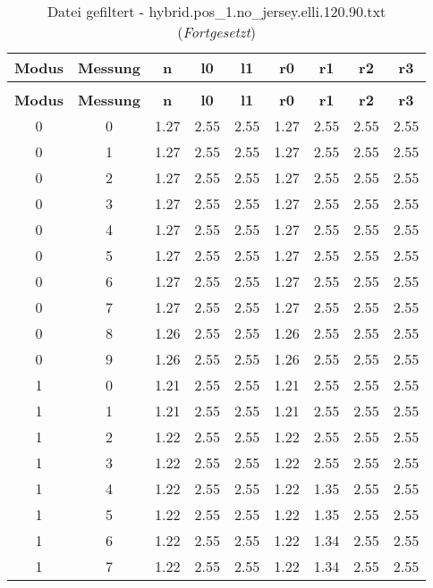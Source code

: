 \begin{longtable}{|c|c||c||c|c||c|c|c|c|}
	\caption{Datei gefiltert - hybrid.pos\_1.no\_jersey.elli.120.90.txt} \label{tab:hybrid.pos-1.no-jersey.elli.120.90.txt} \\ \hline
	\textbf{Modus} & \textbf{Messung} & \textbf{n} & \textbf{l0} & \textbf{l1} & \textbf{r0} & \textbf{r1} & \textbf{r2} & \textbf{r3}\\ \hline
	\endfirsthead
	\caption[]{Datei gefiltert - hybrid.pos\_1.no\_jersey.elli.120.90.txt (\emph{Fortgesetzt})} \\ \hline
	\textbf{Modus} & \textbf{Messung} & \textbf{n} & \textbf{l0} & \textbf{l1} & \textbf{r0} & \textbf{r1} & \textbf{r2} & \textbf{r3}\\ \hline
	\endhead
	0 & 0 & 1.27 & 2.55 & 2.55 & 1.27 & 2.55 & 2.55 & 2.55 \\ \hline
	0 & 1 & 1.27 & 2.55 & 2.55 & 1.27 & 2.55 & 2.55 & 2.55 \\ \hline
	0 & 2 & 1.27 & 2.55 & 2.55 & 1.27 & 2.55 & 2.55 & 2.55 \\ \hline
	0 & 3 & 1.27 & 2.55 & 2.55 & 1.27 & 2.55 & 2.55 & 2.55 \\ \hline
	0 & 4 & 1.27 & 2.55 & 2.55 & 1.27 & 2.55 & 2.55 & 2.55 \\ \hline
	0 & 5 & 1.27 & 2.55 & 2.55 & 1.27 & 2.55 & 2.55 & 2.55 \\ \hline
	0 & 6 & 1.27 & 2.55 & 2.55 & 1.27 & 2.55 & 2.55 & 2.55 \\ \hline
	0 & 7 & 1.27 & 2.55 & 2.55 & 1.27 & 2.55 & 2.55 & 2.55 \\ \hline
	0 & 8 & 1.26 & 2.55 & 2.55 & 1.26 & 2.55 & 2.55 & 2.55 \\ \hline
	0 & 9 & 1.26 & 2.55 & 2.55 & 1.26 & 2.55 & 2.55 & 2.55 \\ \hline
	1 & 0 & 1.21 & 2.55 & 2.55 & 1.21 & 2.55 & 2.55 & 2.55 \\ \hline
	1 & 1 & 1.21 & 2.55 & 2.55 & 1.21 & 2.55 & 2.55 & 2.55 \\ \hline
	1 & 2 & 1.22 & 2.55 & 2.55 & 1.22 & 2.55 & 2.55 & 2.55 \\ \hline
	1 & 3 & 1.22 & 2.55 & 2.55 & 1.22 & 2.55 & 2.55 & 2.55 \\ \hline
	1 & 4 & 1.22 & 2.55 & 2.55 & 1.22 & 1.35 & 2.55 & 2.55 \\ \hline
	1 & 5 & 1.22 & 2.55 & 2.55 & 1.22 & 1.35 & 2.55 & 2.55 \\ \hline
	1 & 6 & 1.22 & 2.55 & 2.55 & 1.22 & 1.34 & 2.55 & 2.55 \\ \hline
	1 & 7 & 1.22 & 2.55 & 2.55 & 1.22 & 1.34 & 2.55 & 2.55 \\ \hline

\end{longtable}
